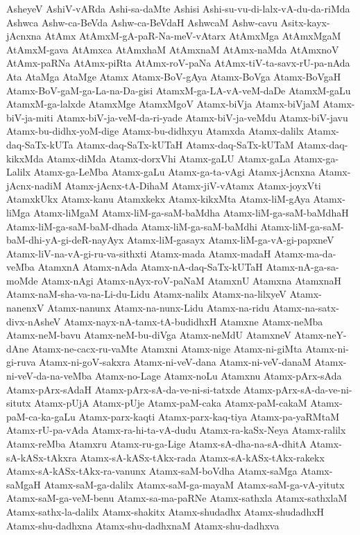 {AsheyeV
AshiV-vARda
Ashi-sa-daMte
Ashisi
Ashi-su-vu-di-lalx-vA-du-da-riMda
Ashwca
Ashw-ca-BeVda
Ashw-ca-BeVdaH
AshwcaM
Ashw-cavu
Asitx-kayx-jAcnxna
AtAmx
AtAmxM-gA-paR-Na-meV-vAtarx
AtAmxMga
AtAmxMgaM
AtAmxM-gava
AtAmxca
AtAmxhaM
AtAmxnaM
AtAmx-naMda
AtAmxnoV
AtAmx-paRNa
AtAmx-piRta
AtAmx-roV-paNa
AtAmx-tiV-ta-savx-rU-pa-nAda
Ata
AtaMga
AtaMge
Atamx
Atamx-BoV-gAya
Atamx-BoVga
Atamx-BoVgaH
Atamx-BoV-gaM-ga-La-na-Da-gisi
AtamxM-ga-LA-vA-veM-daDe
AtamxM-gaLu
AtamxM-ga-lalxde
AtamxMge
AtamxMgoV
Atamx-biVja
Atamx-biVjaM
Atamx-biV-ja-miti
Atamx-biV-ja-veM-da-ri-yade
Atamx-biV-ja-veMdu
Atamx-biV-javu
Atamx-bu-didhx-yoM-dige
Atamx-bu-didhxyu
Atamxda
Atamx-dalilx
Atamx-daq-SaTx-kUTa
Atamx-daq-SaTx-kUTaH
Atamx-daq-SaTx-kUTaM
Atamx-daq-kikxMda
Atamx-diMda
Atamx-dorxVhi
Atamx-gaLU
Atamx-gaLa
Atamx-ga-Lalilx
Atamx-ga-LeMba
Atamx-gaLu
Atamx-ga-ta-vAgi
Atamx-jAcnxna
Atamx-jAcnx-nadiM
Atamx-jAcnx-tA-DihaM
Atamx-jiV-vAtamx
Atamx-joyxVti
AtamxkUkx
Atamx-kanu
Atamxkekx
Atamx-kikxMta
Atamx-liM-gAya
Atamx-liMga
Atamx-liMgaM
Atamx-liM-ga-saM-baMdha
Atamx-liM-ga-saM-baMdhaH
Atamx-liM-ga-saM-baM-dhada
Atamx-liM-ga-saM-baMdhi
Atamx-liM-ga-saM-baM-dhi-yA-gi-deR-nayAyx
Atamx-liM-gasayx
Atamx-liM-ga-vA-gi-papxneV
Atamx-liV-na-vA-gi-ru-va-sithxti
Atamx-mada
Atamx-madaH
Atamx-ma-da-veMba
AtamxnA
Atamx-nAda
Atamx-nA-daq-SaTx-kUTaH
Atamx-nA-ga-sa-moMde
Atamx-nAgi
Atamx-nAyx-roV-paNaM
AtamxnU
Atamxna
AtamxnaH
Atamx-naM-sha-va-na-Li-du-Lidu
Atamx-nalilx
Atamx-na-lilxyeV
Atamx-nanenxV
Atamx-nanunx
Atamx-na-nunx-Lidu
Atamx-na-ridu
Atamx-na-satx-divx-nAsheV
Atamx-nayx-nA-tamx-tA-budidhxH
Atamxne
Atamx-neMba
Atamx-neM-bavu
Atamx-neM-bu-diVga
Atamx-neMdU
AtamxneV
Atamx-neY-dAne
Atamx-ne-cacx-ru-vaMte
Atamxni
Atamx-nige
Atamx-ni-giMta
Atamx-ni-gi-ruva
Atamx-ni-goV-sakxra
Atamx-ni-veV-dana
Atamx-ni-veV-danaM
Atamx-ni-veV-da-na-veMba
Atamx-no-Lage
Atamx-noLu
Atamxnu
Atamx-pArx-sAda
Atamx-pArx-sAdaH
Atamx-pArx-sA-da-ve-ni-si-tatxde
Atamx-pArx-sA-da-ve-ni-situtx
Atamx-pUjA
Atamx-pUje
Atamx-paM-caka
Atamx-paM-cakaM
Atamx-paM-ca-ka-gaLu
Atamx-parx-kaqti
Atamx-parx-kaq-tiya
Atamx-pa-yaRMtaM
Atamx-rU-pa-vAda
Atamx-ra-hi-ta-vA-dudu
Atamx-ra-kaSx-Neya
Atamx-ralilx
Atamx-reMba
Atamxru
Atamx-ru-ga-Lige
Atamx-sA-dha-na-sA-dhitA
Atamx-sA-kASx-tAkxra
Atamx-sA-kASx-tAkx-rada
Atamx-sA-kASx-tAkx-rakekx
Atamx-sA-kASx-tAkx-ra-vanunx
Atamx-saM-boVdha
Atamx-saMga
Atamx-saMgaH
Atamx-saM-ga-dalilx
Atamx-saM-ga-mayaM
Atamx-saM-ga-vA-yitutx
Atamx-saM-ga-veM-benu
Atamx-sa-ma-paRNe
Atamx-sathxla
Atamx-sathxlaM
Atamx-sathx-la-dalilx
Atamx-shakitx
Atamx-shudadhx
Atamx-shudadhxH
Atamx-shu-dadhxna
Atamx-shu-dadhxnaM
Atamx-shu-dadhxva
}
